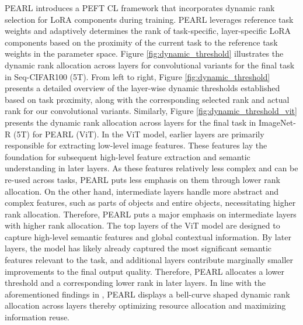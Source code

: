 \documentclass[10pt]{article} %
\begin{document}
PEARL introduces a PEFT CL framework that incorporates dynamic rank selection for LoRA components during training. PEARL leverages reference task weights and adaptively determines the rank of task-specific, layer-specific LoRA components based on the proximity of the current task to the reference task weights in the parameter space. Figure \ref{fig:dynamic_threshold} illustrates the dynamic rank allocation across layers for convolutional variants for the final task in Seq-CIFAR100 (5T). From left to right, Figure \ref{fig:dynamic_threshold} presents a detailed overview of the layer-wise dynamic thresholds established based on task proximity, along with the corresponding selected rank and actual rank for our convolutional variants. 
Similarly, Figure \ref{fig:dynamic_threshold_vit} presents 
 the dynamic rank allocation across layers for the final task in ImageNet-R (5T) for PEARL (ViT). In the ViT model, earlier layers are primarily responsible for extracting low-level image features. These features lay the foundation for subsequent high-level feature extraction and semantic understanding in later layers. As these features relatively less complex and can be re-used across tasks, PEARL puts less emphasis on them through lower rank allocation. On the other hand, intermediate layers handle more abstract and complex features, such as parts of objects and entire objects, necessitating higher rank allocation. Therefore, PEARL puts a major emphasis on intermediate layers with higher rank allocation. The top layers of the ViT model are designed to capture high-level semantic features and global contextual information. By later layers, the model has likely already captured the most significant semantic features relevant to the task, and additional layers contribute marginally smaller improvements to the final output quality. Therefore, PEARL allocates a lower threshold and a corresponding lower rank in later layers. In line with the aforementioned findings in \citet{zeng2024peeling}, PEARL displays a bell-curve shaped dynamic rank allocation across layers thereby optimizing resource allocation and maximizing information reuse. 
\end{document}
